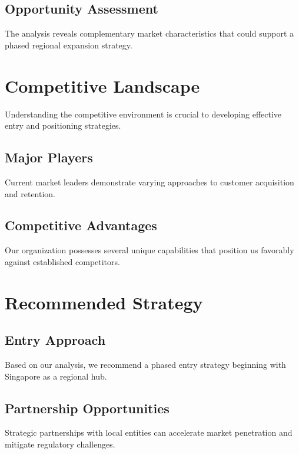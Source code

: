 \documentclass[11pt,a4paper]{article}
\begin{document}
\subsection{Opportunity Assessment}

The analysis reveals complementary market characteristics that could support a phased regional expansion strategy.

\lipsum[1]

\section{Competitive Landscape}

Understanding the competitive environment is crucial to developing effective entry and positioning strategies.

\subsection{Major Players}

Current market leaders demonstrate varying approaches to customer acquisition and retention.

\lipsum[2]

\subsection{Competitive Advantages}

Our organization possesses several unique capabilities that position us favorably against established competitors.

\lipsum[3]

\section{Recommended Strategy}

\subsection{Entry Approach}

Based on our analysis, we recommend a phased entry strategy beginning with Singapore as a regional hub.

\lipsum[4]

\subsection{Partnership Opportunities}

Strategic partnerships with local entities can accelerate market penetration and mitigate regulatory challenges.
\end{document}
